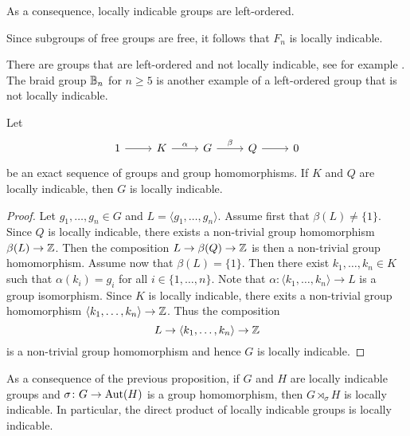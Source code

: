 

As a consequence, 
locally indicable groups are left-ordered. 

\begin{example}
    Since subgroups of free groups are free, 
    it follows that $F_n$ is locally indicable. 
\end{example}

There are groups that are left-ordered and not locally indicable, see
for example \cite{MR1084707}. The braid group
$\mathbb{B}_n$ for $n\geq5$ is another example of a left-ordered group that is not locally indicable.

\begin{proposition}
\label{pro:LI_exact}
    Let
    \[\begin{tikzcd}
	1 & K & G & Q & 0
	\arrow[from=1-1, to=1-2]
	\arrow["\alpha", from=1-2, to=1-3]
	\arrow["\beta", from=1-3, to=1-4]
	\arrow[from=1-4, to=1-5]
\end{tikzcd}
\]
    be an exact sequence of groups and group homomorphisms. 
    If $K$ and $Q$ are
    locally indicable, then $G$ is locally indicable.
\end{proposition}

\begin{proof}
    Let $g_1,\dots,g_n\in G$ and $L=\langle g_1,\dots,g_n\rangle$. 
    Assume first that $\beta(L)\ne\{1\}$. Since $Q$ is locally indicable, 
    there exists a non-trivial group homomorphism $\beta(L)\to\mathbb{Z}$. Then the 
    composition $L\to\beta(Q)\to\mathbb{Z}$ is then a non-trivial group homomorphism. Assume now
    that $\beta(L)=\{1\}$. Then there exist $k_1,\dots,k_n\in K$ 
    such that $\alpha(k_i)=g_i$ for all $i\in\{1,\dots,n\}$. Note that
    $\alpha\colon \langle k_1,\dots,k_n\rangle\to L$ is a group isomorphism. Since
    $K$ is locally indicable, there exits a non-trivial group 
    homomorphism $\langle k_1,\dots,k_n\rangle\to\mathbb{Z}$. 
    Thus the composition \[
    L\to\langle k_1,\dots,k_n\rangle\to\mathbb{Z}
    \]
    is a non-trivial
    group homomorphism 
    and hence $G$ is locally indicable. 
\end{proof}

As a consequence of the previous proposition, 
if $G$ and $H$ are locally indicable groups and 
$\sigma\colon G\to\operatorname{Aut}(H)$ is a group homomorphism, then 
$G\rtimes_\sigma H$ is locally indicable. In particular, the 
direct product of locally indicable groups is locally indicable.

